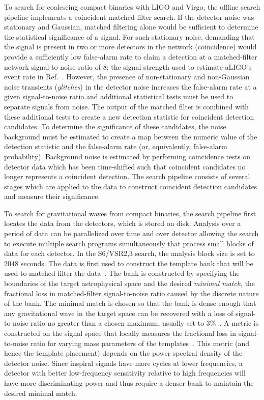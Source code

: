 To search for coalescing compact binaries with LIGO and Virgo, the offline search
pipeline implements a coincident matched-filter search.  If the detector noise
was stationary and Gaussian, matched filtering alone would be sufficient to
determine the statistical significance of a signal. For such stationary noise, 
demanding that the signal is present in two or more detectors in the network 
(coincidence) would provide a sufficiently low false-alarm rate to claim a 
detection at a matched-filter network signal-to-noise ratio of 8; the signal 
strength used to estimate aLIGO's event rate in Ref.~\cite{Abadie:2010cf}.
However, the presence of non-stationary and non-Gaussian noise
transients (\emph{glitches})
in the detector noise increases the false-alarm rate at a given
signal-to-noise ratio and additional statistical tests must be used to separate
signals from noise. The output of the matched filter is combined with these
additional tests to create a new detection statistic for coincident detection
candidates. To determine the significance of these candidates, the noise
background must be estimated to create a map between the numeric value of the
detection statistic and the false-alarm rate (or, equivalently, false-alarm
probability). Background noise is estimated by performing coincidence tests on
detector data which has been time-shifted such that coincident candidates no
longer represents a coincident detection. The search pipeline consists of
several stages which are applied to the data to construct coincident detection
candidates and measure their significance. 

To search for gravitational waves from compact binaries, the search pipeline
first locates the data from the detectors, which is stored on disk. Analysis
over a period of data can be parallelized over time and over detector allowing
the search to execute multiple search programs simultaneously that process
small blocks of data for each detector. In the S6/VSR2,3 search, the 
analysis block size is set to $2048$ seconds.
The data is first used to construct the
template bank that will be used to matched filter the
data~\cite{Sathyaprakash:1991mt,Dhurandhar:1992mw,Owen:1995tm,Owen:1998dk,Babak:2006ty}.
The bank is constructed by specifying the boundaries of the target
astrophysical space and the desired \emph{minimal match}, the fractional loss in
matched-filter signal-to-noise ratio caused by the discrete nature of the bank.
The minimal match is chosen so that the bank is dense enough that any
gravitational wave in the target space can be recovered with a loss of
signal-to-noise ratio no greater than a chosen maximum, usually set to 3\%~\cite{Abbott:2011ys}. 
A metric is constructed on the signal space that
locally measures the fractional loss in signal-to-noise ratio for varying mass
parameters of the templates~\cite{Owen:1998dk}.  This metric (and hence
the template placement) depends on the power spectral density of the
detector noise. Since inspiral signals have more cycles at lower frequencies,
a detector with better low-frequency sensitivity relative to high frequencies
will have more discriminating power and thus require a denser bank to maintain
the desired minimal match.

